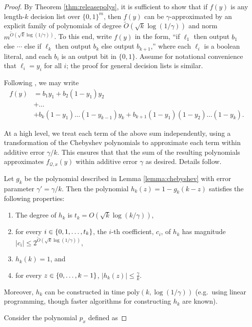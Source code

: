 \documentclass[11pt]{article}
\newcommand\cQ{\mathcal{Q}}
\newcommand\poly{\mathrm{poly}}
\newcommand\bits{\{0,1\}}
\theoremstyle{definition}
\begin{document}
\begin{proof} By Theorem \ref{thm:releasepolys}, it is sufficient to show that if $f(y)$ is any length-$k$ decision list over $\bits^m$, then $f(y)$ can be $\gamma$-approximated 
by an explicit family of polynomials of degree $\tilde{O}(\sqrt{k} \log(1/\gamma))$ and norm $m^{\tilde{O}(\sqrt{k} \log(1/\gamma))}$. To this end, write $f(y)$ in the form,
``if $\ell_1$ then output $b_1$ else $\cdots$ else if $\ell_k$
then output $b_k$ else output $b_{k+1}$,'' where each
$\ell_i$ is a boolean literal, and each $b_i$ is an output
bit in $\{0,1\}.$ Assume for notational convenience that $\ell_i=y_i$ for all $i$; the proof for general decision lists is similar.

Following \cite[Theorem 8]{KlivansSe04}, we may write
\begin{align*}
f(y) 
&= b_1y_1 + b_2(1-y_1)y_2 \\
&+ \dots \\
&+ b_k(1-y_1) \dots(1-y_{k-1})y_k + b_{k+1}(1-y_1)(1-y_2)\dots(1-y_k).
\end{align*}

At a high level, we treat each term of the above sum independently, using a transformation of the Chebyshev polynomials to approximate each term
within additive error $\gamma/k$. This ensures that 
that the sum of the resulting polynomials approximates
$f_{\cQ, x}(y)$ within additive error $\gamma$ as desired. Details follow.

Let $g_k$ be the polynomial described in Lemma \ref{lemma:chebyshev} with error parameter $\gamma'=\gamma / k$. Then the polynomial $h_k(z)=1-g_k(k-z)$ satisfies the following properties:

\begin{enumerate}
\item The degree of $h_k$ is $t_k = O(\sqrt{k} \log(k/\gamma))$,
\item  for every $i \in \left\{0,1,\dots, t_k\right\}$, the $i$-th coefficient, $c_i$, of $h_k$ has magnitude $|c_i| \leq  2^{\tilde{O}(\sqrt{k} \log(1/\gamma))}$,
\item  $h_k(k) = 1$, and
\item for every $z \in \left\{0, \dots, k-1\right\}$, $|h_k(z)| \leq \frac{\gamma}{k}$.
\end{enumerate}
Moreover, $h_k$ can be constructed in time $\poly(k, \log(1/\gamma))$ (e.g.~using linear programming, though faster algorithms for constructing $h_k$ are known).

Consider the polynomial $p_x$ defined as 


\end{proof}
\end{document}
